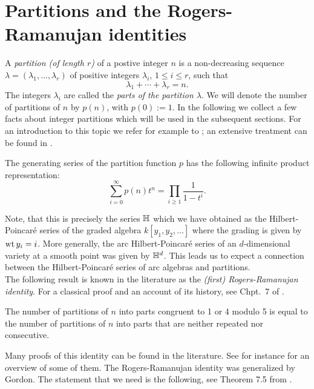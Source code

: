 \section{Partitions and the Rogers-Ramanujan identities}\label{sec:section_4}

A {\it partition (of length $r$)} of a postive integer $n$ is a
non-decreasing sequence $\lambda=(\lambda_1,\ldots, \lambda_r)$ of
positive integers $\lambda_i$, $1\leq i \leq r$, such that $$\lambda_1+
\cdots + \lambda_r =n.$$ The integers $\lambda_i$ are called the {\it
  parts of the partition $\lambda$}. We will denote the number of partitions of
$n$ by $p(n)$, with $p(0):=1$. In the
following we collect a few facts about integer partitions which will
be used in the subsequent sections. For an introduction to this topic
we refer for example to \cite{wilf_lecturesonis}; an extensive
treatment can be found in \cite{andrews_partitions}.

\begin{Prop}\label{prop:generatingfunction_partitions}
  The generating series of the partition function $p$ has the
  following infinite product representation: $$\sum_{i=0}^\infty p(n)t^n = \prod_{i\geq
    1}\frac{1}{1-t^i}.$$
\end{Prop}

Note, that this is precisely the series $\mathbb{H}$ which we have obtained as the
Hilbert-Poincar\'{e} series of the graded algebra $k[y_1, y_2,
\ldots]$ where the grading is given by $\textnormal{wt}\, y_i =i$. More generally,
the arc Hilbert-Poincar\'{e} series of an $d$-dimensional variety at a smooth point was given by
$\mathbb{H}^d$. This leads us to expect a connection between the
Hilbert-Poincar\'{e} series of arc algebras and partitions.\\

The following result is known in the literature as the {\it (first)
 Rogers-Ramanujan identity}. For a classical proof and an account of
its history, see Chpt.\ 7 of \cite{andrews_partitions}.

\begin{Thm}\label{thm:rogersramanujan}
  The number of partitions of $n$ into parts congruent to 1 or 4 modulo 5
  is equal to the number of partitions of $n$ into parts that are neither
  repeated nor consecutive.
\end{Thm}

Many proofs of this identity can be found in the literature. See for instance \cite{andrews_proofs} for an overview of some of them. The Rogers-Ramanujan identity was generalized by Gordon. The statement that we need is the following, see Theorem 7.5 from \cite{andrews_partitions}.

